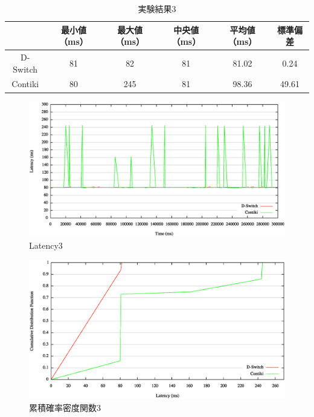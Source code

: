 \begin{table}[htbp]
  \centering
  \caption{実験結果3}
  \begin{tabular}{|c||c|c|c|c|c|} \hline
    \backslashbox{}{} & 最小値（ms） & 最大値（ms） & 中央値（ms） & 平均値（ms） & 標準偏差 \\ \hline \hline
    D-Switch & 81 & 82 & 81 & 81.02 & 0.24 \\ \hline
    Contiki & 80 & 245 & 81 & 98.36 & 49.61 \\ \hline
  \end{tabular}
  \label{tab:latency3}
\end{table}

\begin{figure}[htbp]
 \begin{center}
  \includegraphics[width=120mm]{./images/latency3.eps}
 \end{center}
 \caption{Latency3}
 \label{fig:latency3}
\end{figure}

\begin{figure}[htbp]
 \begin{center}
  \includegraphics[width=120mm]{./images/cdf3.eps}
 \end{center}
 \caption{累積確率密度関数3}
 \label{fig:cdf3}
\end{figure}



